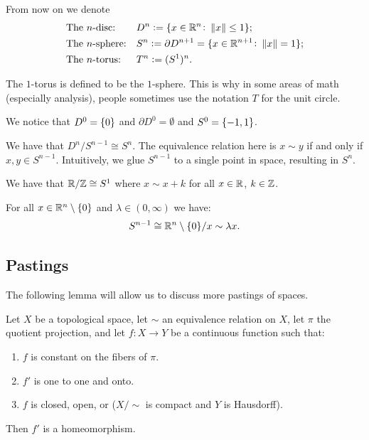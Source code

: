 \documentclass[11pt,a4paper]{article}
\begin{document}
\begin{remark}
  From now on we denote
  \begin{align*}
    &\text{The $n$-disc:} &&D^n := \{x \in \mathbb{R}^n \colon \left\lVert x\right\rVert \le 1\}; \\
    &\text{The $n$-sphere:} &&S^n := \partial D^{n+1} = \{x \in \mathbb{R}^{n+1} \colon \left\lVert x\right\rVert = 1\}; \\
    &\text{The $n$-torus:} &&T^n := (S^1)^n.
  \end{align*}
\end{remark}

\begin{remark}
  The $1$-torus is defined to be the $1$-sphere.
  This is why in some areas of math (especially analysis),
  people sometimes use the notation $T$ for the unit circle.
\end{remark}

\begin{remark}
  We notice that $D^0 = \left\{0\right\}$ and $\partial D^0 = \emptyset$ and
  $S^0 = \left\{-1, 1\right\}$.
\end{remark}

\begin{example}
  We have that $D^n / S^{n-1} \cong S^n$.
  The equivalence relation here is $x \sim y$ if and only if $x,y \in S^{n-1}$.
  Intuitively, we glue $S^{n-1}$ to a single point in space, resulting
  in $S^n$.
\end{example}
\begin{example}
  We have that $\mathbb{R} / \mathbb{Z} \cong S^1$ where $x \sim x + k$ for all
  $x \in \mathbb{R}$, $k \in \mathbb{Z}$.
\end{example}
\begin{example}
  For all $x \in \mathbb{R}^n \setminus \left\{0\right\}$ and $\lambda \in (0,\infty)$ we
  have:
  \[
    S^{n-1} \cong {\mathbb{R}^n \setminus \left\{0\right\}}/{x \sim \lambda x}.
  \]
\end{example}

\subsection{Pastings}

The following lemma will allow us to discuss more pastings of spaces.

\begin{lemma}
  Let $X$ be a topological space,
  let $\sim$ an equivalence relation on $X$,
  let $\pi$ the quotient projection,
  and let $f \colon X \to Y$ be a continuous function such that:
  \begin{enumerate}
    \item[(1)] $f$ is constant on the fibers of $\pi$.
    \item[(2)] $f'$ is one to one and onto.
    \item[(3)] $f$ is closed, open, or (${X}/{\sim}$ is compact and
      $Y$ is Hausdorff).
  \end{enumerate}
  Then $f'$ is a homeomorphism.
\end{lemma}
\end{document}
